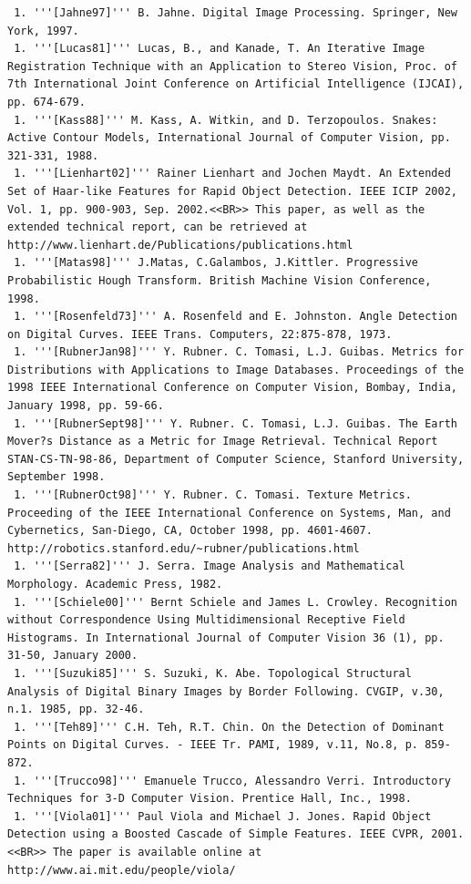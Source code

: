 \begin{verbatim}
 1. '''[Jahne97]''' B. Jahne. Digital Image Processing. Springer, New York, 1997.
 1. '''[Lucas81]''' Lucas, B., and Kanade, T. An Iterative Image Registration Technique with an Application to Stereo Vision, Proc. of 7th International Joint Conference on Artificial Intelligence (IJCAI), pp. 674-679.
 1. '''[Kass88]''' M. Kass, A. Witkin, and D. Terzopoulos. Snakes: Active Contour Models, International Journal of Computer Vision, pp. 321-331, 1988.
 1. '''[Lienhart02]''' Rainer Lienhart and Jochen Maydt. An Extended Set of Haar-like Features for Rapid Object Detection. IEEE ICIP 2002, Vol. 1, pp. 900-903, Sep. 2002.<<BR>> This paper, as well as the extended technical report, can be retrieved at http://www.lienhart.de/Publications/publications.html
 1. '''[Matas98]''' J.Matas, C.Galambos, J.Kittler. Progressive Probabilistic Hough Transform. British Machine Vision Conference, 1998.
 1. '''[Rosenfeld73]''' A. Rosenfeld and E. Johnston. Angle Detection on Digital Curves. IEEE Trans. Computers, 22:875-878, 1973.
 1. '''[RubnerJan98]''' Y. Rubner. C. Tomasi, L.J. Guibas. Metrics for Distributions with Applications to Image Databases. Proceedings of the 1998 IEEE International Conference on Computer Vision, Bombay, India, January 1998, pp. 59-66.
 1. '''[RubnerSept98]''' Y. Rubner. C. Tomasi, L.J. Guibas. The Earth Mover?s Distance as a Metric for Image Retrieval. Technical Report STAN-CS-TN-98-86, Department of Computer Science, Stanford University, September 1998.
 1. '''[RubnerOct98]''' Y. Rubner. C. Tomasi. Texture Metrics. Proceeding of the IEEE International Conference on Systems, Man, and Cybernetics, San-Diego, CA, October 1998, pp. 4601-4607. http://robotics.stanford.edu/~rubner/publications.html
 1. '''[Serra82]''' J. Serra. Image Analysis and Mathematical Morphology. Academic Press, 1982.
 1. '''[Schiele00]''' Bernt Schiele and James L. Crowley. Recognition without Correspondence Using Multidimensional Receptive Field Histograms. In International Journal of Computer Vision 36 (1), pp. 31-50, January 2000.
 1. '''[Suzuki85]''' S. Suzuki, K. Abe. Topological Structural Analysis of Digital Binary Images by Border Following. CVGIP, v.30, n.1. 1985, pp. 32-46.
 1. '''[Teh89]''' C.H. Teh, R.T. Chin. On the Detection of Dominant Points on Digital Curves. - IEEE Tr. PAMI, 1989, v.11, No.8, p. 859-872.
 1. '''[Trucco98]''' Emanuele Trucco, Alessandro Verri. Introductory Techniques for 3-D Computer Vision. Prentice Hall, Inc., 1998.
 1. '''[Viola01]''' Paul Viola and Michael J. Jones. Rapid Object Detection using a Boosted Cascade of Simple Features. IEEE CVPR, 2001.<<BR>> The paper is available online at http://www.ai.mit.edu/people/viola/

\end{verbatim}
